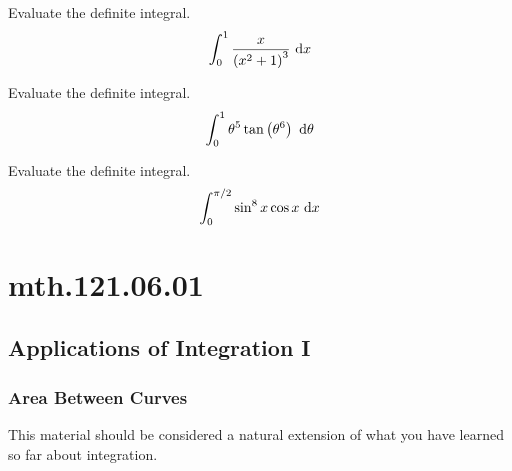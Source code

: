 \documentclass[12pt,addpoints, answers, fleqn]{exam}
\begin{document}
\begin{teacher}
\begin{questions}
Evaluate the definite integral.
\[
\int_0^1 \frac{x}{\left(x^2+1\right)^3} \ {\rm{d}} x
\]
\begin{solution}
\end{solution}
\question 	%

Evaluate the definite integral.
\[
\int_0^1 \theta^5 \tan \left( \theta^6\right) \ {\rm{d}} \theta
\]

\begin{solution}
\end{solution}
\question 	%

Evaluate the definite integral.
\[
\int_0^{\pi/2} \sin^8 x \cos x \ {\rm{d}} x
\]

\begin{solution}
\end{solution}
\end{questions}
\end{teacher}
\vfill
\pagebreak


\section{mth.121.06.01}
\subsection{Applications of Integration I}

\subsubsection{Area Between Curves}
This material should be considered a natural extension of what you have learned so far about integration.
\end{document}

